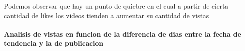             \begin{figure}
            \end{figure}
        \FloatBarrier
        Podemos observar que hay un punto de quiebre en el cual a partir de
        cierta cantidad de likes los videos tienden a aumentar su cantidad
        de vistas

        \newpage
        \paragraph{Analisis de vistas en funcion de la diferencia de dias entre la fecha de tendencia y la de publicacion}

